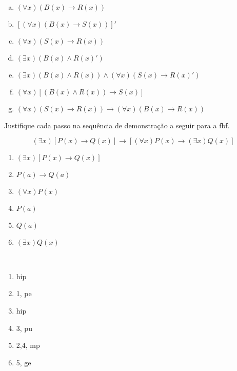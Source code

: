 \documentclass[a4paper, 12pt, addpoints]{exam}
\begin{document}
\begin{questions}
  \begin{resp}~
    \begin{multicols}{2}
      \begin{enumerate}[a)]
        \item $ (\forall x)(B(x) \rightarrow R(x)) $
        \item $ [(\forall x)(B(x) \rightarrow S(x))]' $
        \item $ (\forall x)(S(x) \rightarrow R(x)) $
        \item $ (\exists x)(B(x) \land R(x)') $
        \item $ (\exists x)(B(x) \land R(x)) \land (\forall x)(S(x) \rightarrow R(x)') $
        \item $ (\forall x)[(B(x) \land R(x)) \rightarrow S(x)] $
        \item $ (\forall x)(S(x) \rightarrow R(x)) \rightarrow (\forall x)(B(x) \rightarrow R(x)) $
      \end{enumerate}
    \end{multicols}
  \end{resp}

  \question  Justifique cada passo na sequência de demonstração a seguir para a fbf.

  \[ (\exists x)[P(x) \rightarrow Q(x)] \rightarrow [(\forall x)P(x) \rightarrow (\exists x)Q(x)] \]

  \begin{enumerate}[1.]
    \item $(\exists x)[P(x) \rightarrow Q(x)]$
    \item $P(a) \rightarrow Q(a) $
    \item $(\forall x)P(x)$
    \item $P(a)$
    \item $Q(a)$
    \item $(\exists x)Q(x)$
  \end{enumerate}

  \begin{resp}~
    \begin{multicols}{2}
      \begin{enumerate}
        \item hip
        \item 1, pe
        \item hip
        \item 3, pu
        \item 2,4, mp
        \item 5, ge
      \end{enumerate}
    \end{multicols}
  \end{resp}


\end{questions}
\end{document}
